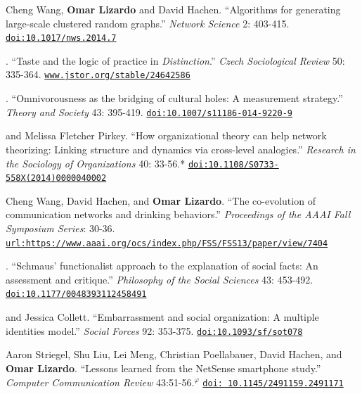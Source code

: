 

\ind Cheng Wang, {\bf Omar Lizardo} and David Hachen. ``Algorithms for generating large-scale clustered random graphs.'' {\em Network Science} 2: 403-415. \href{https://doi.org/10.1017/nws.2014.7}{\nolinkurl{doi:10.1017/nws.2014.7}}

. ``Taste and the logic of practice in {\em Distinction}.'' {\em Czech Sociological Review} 50: 335-364. \href{https://www.jstor.org/stable/24642586}{\nolinkurl{www.jstor.org/stable/24642586}}

. ``Omnivorousness as the bridging of cultural holes: A measurement strategy.'' {\em Theory and Society}  43: 395-419. \href{https://doi.org/10.1007/s11186-014-9220-9}{\nolinkurl{doi:10.1007/s11186-014-9220-9}}

 and Melissa Fletcher Pirkey. ``How organizational theory can help network theorizing: Linking structure and dynamics via cross-level analogies.'' {\em Research in the Sociology of Organizations} 40: 33-56.\textcolor{uclablue}{*} \href{https://doi.org/10.1108/S0733-558X(2014)0000040002}{\nolinkurl{doi:10.1108/S0733-558X(2014)0000040002}}

\ind Cheng Wang, David Hachen, and {\bf Omar Lizardo}. ``The co-evolution of communication networks and drinking behaviors.''  {\em Proceedings of the AAAI Fall Symposium Series}: 30-36. \href{https://www.aaai.org/ocs/index.php/FSS/FSS13/paper/view/7404}{\nolinkurl{url:https://www.aaai.org/ocs/index.php/FSS/FSS13/paper/view/7404}}

.  ``Schmaus' functionalist approach to the explanation of social facts: An assessment and critique.''  {\em Philosophy of the Social Sciences} 43: 453-492. \href{https://doi.org/10.1177/0048393112458491}{\nolinkurl{doi:10.1177/0048393112458491}} 

 and Jessica Collett. ``Embarrassment and social organization: A multiple identities model.'' {\em Social Forces} 92: 353-375.  \href{https://doi.org/10.1093/sf/sot078}{\nolinkurl{doi:10.1093/sf/sot078}}

\ind Aaron Striegel, Shu Liu, Lei Meng, Christian Poellabauer, David Hachen, and {\bf Omar Lizardo}. ``Lessons learned from the NetSense smartphone study.'' {\em Computer Communication Review} 43:51-56.\textcolor{black}{$^{\varphi}$}  \href{https://doi.org/ 10.1145/2491159.2491171}{\nolinkurl{doi: 10.1145/2491159.2491171}}


